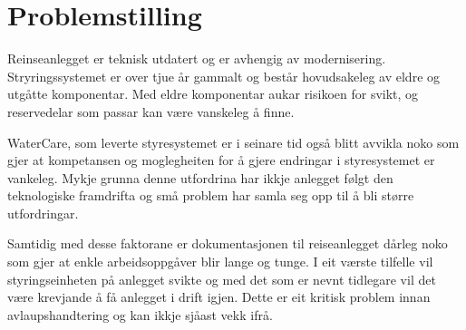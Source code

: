 \section{Problemstilling}
Reinseanlegget er teknisk utdatert og er avhengig av modernisering. Stryringssystemet er over tjue år gammalt
og består hovudsakeleg av eldre og utgåtte komponentar. Med eldre komponentar aukar risikoen for svikt, 
og reservedelar som passar kan være vanskeleg å finne.

WaterCare, som leverte styresystemet er i seinare tid også blitt avvikla noko som gjer at kompetansen 
og moglegheiten for å gjere endringar i styresystemet er vankeleg. 
Mykje grunna denne utfordrina har ikkje anlegget følgt den teknologiske framdrifta 
og små problem har samla seg opp til å bli større utfordringar.

Samtidig med desse faktorane er dokumentasjonen til reiseanlegget dårleg noko som gjer at enkle arbeidsoppgåver blir lange og tunge.
I eit værste tilfelle vil styringseinheten på anlegget svikte og med det som er nevnt tidlegare vil det være krevjande
å få anlegget i drift igjen. Dette er eit kritisk problem innan avlaupshandtering og kan ikkje sjåast vekk ifrå.
\newline




